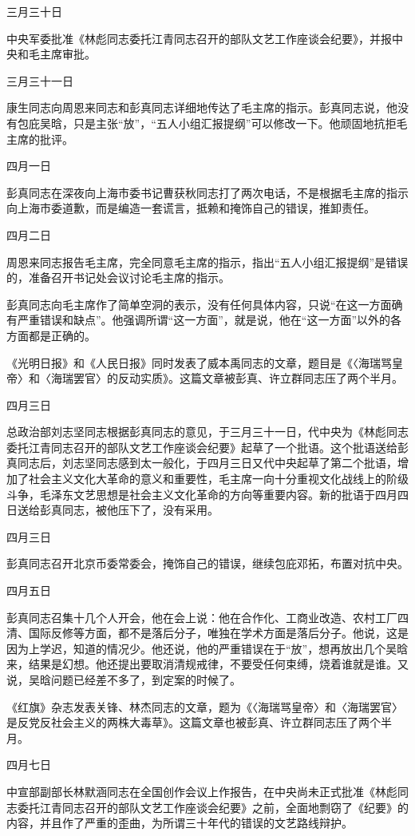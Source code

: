 \begin{maonote}
三月三十日

中央军委批准《林彪同志委托江青同志召开的部队文艺工作座谈会纪要》，并报中央和毛主席审批。

三月三十一日

康生同志向周恩来同志和彭真同志详细地传达了毛主席的指示。彭真同志说，他没有包庇吴晗，只是主张“放”，“五人小组汇报提纲”可以修改一下。他顽固地抗拒毛主席的批评。

四月一日

彭真同志在深夜向上海市委书记曹获秋同志打了两次电话，不是根据毛主席的指示向上海市委道歉，而是编造一套谎言，抵赖和掩饰自己的错误，推卸责任。

四月二日

周恩来同志报告毛主席，完全同意毛主席的指示，指出“五人小组汇报提纲”是错误的，准备召开书记处会议讨论毛主席的指示。

彭真同志向毛主席作了简单空洞的表示，没有任何具体内容，只说“在这一方面确有严重错误和缺点”。他强调所谓“这一方面”，就是说，他在“这一方面”以外的各方面都是正确的。

《光明日报》和《人民日报》同时发表了威本禹同志的文章，题目是《〈海瑞骂皇帝〉和〈海瑞罢官〉的反动实质》。这篇文章被彭真、许立群同志压了两个半月。

四月三日

总政治部刘志坚同志根据彭真同志的意见，于三月三十一日，代中央为《林彪同志委托江青同志召开的部队文艺工作座谈会纪要》起草了一个批语。这个批语送给彭真同志后，刘志坚同志感到太一般化，于四月三日又代中央起草了第二个批语，增加了社会主义文化大革命的意义和重要性，毛主席一向十分重视文化战线上的阶级斗争，毛泽东文艺思想是社会主义文化革命的方向等重要内容。新的批语于四月四日送给彭真同志，被他压下了，没有采用。

四月三日

彭真同志召开北京币委常委会，掩饰自己的错误，继续包庇邓拓，布置对抗中央。

四月五日

彭真同志召集十几个人开会，他在会上说：他在合作化、工商业改造、农村工厂四清、国际反修等方面，都不是落后分子，唯独在学术方面是落后分子。他说，这是因为上学迟，知道的情况少。他还说，他的严重错误在于“放”，想再放出几个吴晗来，结果是幻想。他还提出要取消清规戒律，不要受任何束缚，烧着谁就是谁。又说，吴晗问题已经差不多了，到定案的时候了。

《红旗》杂志发表关锋、林杰同志的文章，题为《〈海瑞骂皇帝〉和〈海瑞罢官〉是反党反社会主义的两株大毒草》。这篇文章也被彭真、许立群同志压了两个半月。

四月七日

中宣部副部长林默涵同志在全国创作会议上作报告，在中央尚未正式批准《林彪同志委托江青同志召开的部队文艺工作座谈会纪要》之前，全面地剽窃了《纪要》的内容，并且作了严重的歪曲，为所谓三十年代的错误的文艺路线辩护。


\end{maonote}
